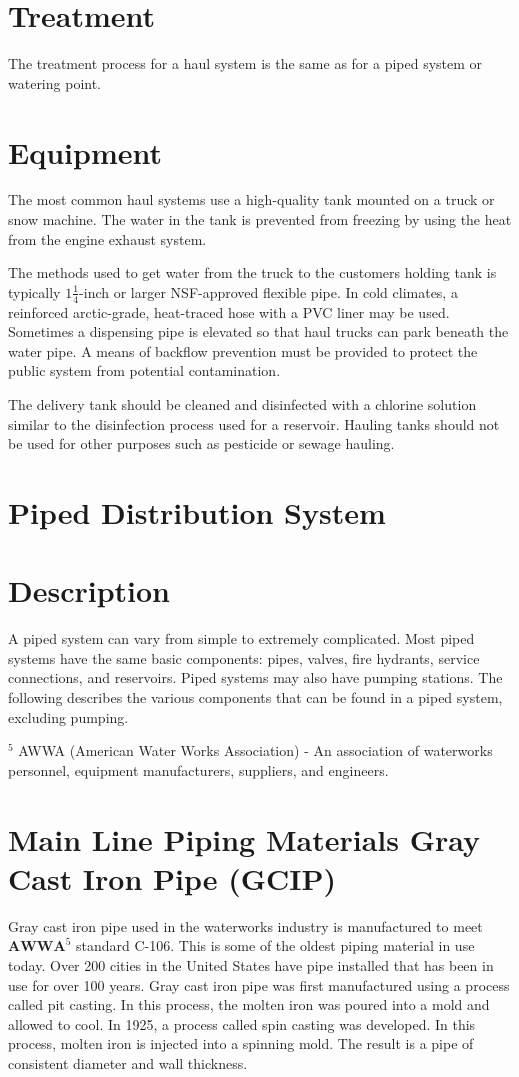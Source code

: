 \documentclass[10pt]{article}
\begin{document}
\section{Treatment}
The treatment process for a haul system is the same as for a piped system or watering point.

\section{Equipment}
The most common haul systems use a high-quality tank mounted on a truck or snow machine. The water in the tank is prevented from freezing by using the heat from the engine exhaust system.

The methods used to get water from the truck to the customers holding tank is typically $1 \frac{1}{4}$-inch or larger NSF-approved flexible pipe. In cold climates, a reinforced arctic-grade, heat-traced hose with a PVC liner may be used. Sometimes a dispensing pipe is elevated so that haul trucks can park beneath the water pipe. A means of backflow prevention must be provided to protect the public system from potential contamination.

The delivery tank should be cleaned and disinfected with a chlorine solution similar to the disinfection process used for a reservoir. Hauling tanks should not be used for other purposes such as pesticide or sewage hauling.

\section{Piped Distribution System}
\section{Description}
A piped system can vary from simple to extremely complicated. Most piped systems have the same basic components: pipes, valves, fire hydrants, service connections, and reservoirs. Piped systems may also have pumping stations. The following describes the various components that can be found in a piped system, excluding pumping.

${ }^{5}$ AWWA (American Water Works Association) - An association of waterworks personnel, equipment manufacturers, suppliers, and engineers.

\section{Main Line Piping Materials Gray Cast Iron Pipe (GCIP)}
Gray cast iron pipe used in the waterworks industry is manufactured to meet $\mathbf{A W W A}^{5}$ standard C-106. This is some of the oldest piping material in use today. Over 200 cities in the United States have pipe installed that has been in use for over 100 years. Gray cast iron pipe was first manufactured using a process called pit casting. In this process, the molten iron was poured into a mold and allowed to cool. In 1925, a process called spin casting was developed. In this process, molten iron is injected into a spinning mold. The result is a pipe of consistent diameter and wall thickness.
\end{document}
